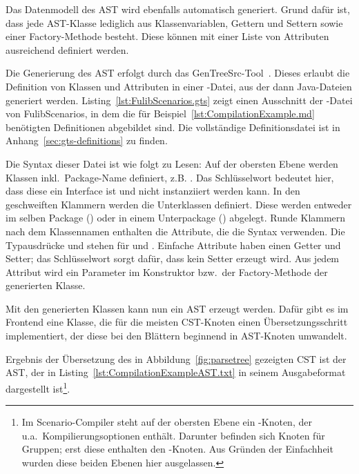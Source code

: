 Das Datenmodell des AST wird ebenfalls automatisch generiert.
Grund dafür ist, dass jede AST-Klasse lediglich aus Klassenvariablen, Gettern und Settern sowie einer Factory-Methode besteht.
Diese können mit einer Liste von Attributen ausreichend definiert werden.

Die Generierung des AST erfolgt durch das GenTreeSrc-Tool~\cite{gentreesrc}.
Dieses erlaubt die Definition von Klassen und Attributen in einer -Datei,
aus der dann Java-Dateien generiert werden.
Listing~\ref{lst:FulibScenarios.gts} zeigt einen Ausschnitt der -Datei von FulibScenarios,
in dem die für Beispiel~\ref{lst:CompilationExample.md} benötigten Definitionen abgebildet sind.
Die vollständige Definitionsdatei ist in Anhang~\ref{sec:gts-definitions} zu finden.


Die Syntax dieser Datei ist wie folgt zu Lesen:
Auf der obersten Ebene werden Klassen inkl.\ Package-Name definiert, z.B. .
Das Schlüsselwort  bedeutet hier, dass diese ein Interface ist und nicht instanziiert werden kann.
In den geschweiften Klammern werden die Unterklassen definiert.
Diese werden entweder im selben Package () oder in einem Unterpackage
() abgelegt.
Runde Klammern nach dem Klassennamen enthalten die Attribute, die die Syntax  verwenden.
Die Typausdrücke \code{[T]} und \code{[T:U]} stehen für  und .
Einfache Attribute haben einen Getter und Setter;
das Schlüsselwort  sorgt dafür, dass kein Setter erzeugt wird.
Aus jedem Attribut wird ein Parameter im Konstruktor bzw.\ der Factory-Methode der generierten Klasse.

Mit den generierten Klassen kann nun ein AST erzeugt werden.
Dafür gibt es im Frontend eine Klasse, die für die meisten CST-Knoten einen Übersetzungsschritt implementiert,
der diese bei den Blättern beginnend in AST-Knoten umwandelt.

Ergebnis der Übersetzung des in Abbildung~\ref{fig:parsetree} gezeigten CST ist der AST,
der in Listing~\ref{lst:CompilationExampleAST.txt} in seinem Ausgabeformat dargestellt ist\footnote{
    Im Scenario-Compiler steht auf der obersten Ebene ein -Knoten, der u.a.\ Kompilierungsoptionen enthält.
    Darunter befinden sich Knoten für Gruppen;
    erst diese enthalten den -Knoten.
    Aus Gründen der Einfachheit wurden diese beiden Ebenen hier ausgelassen.
}.

